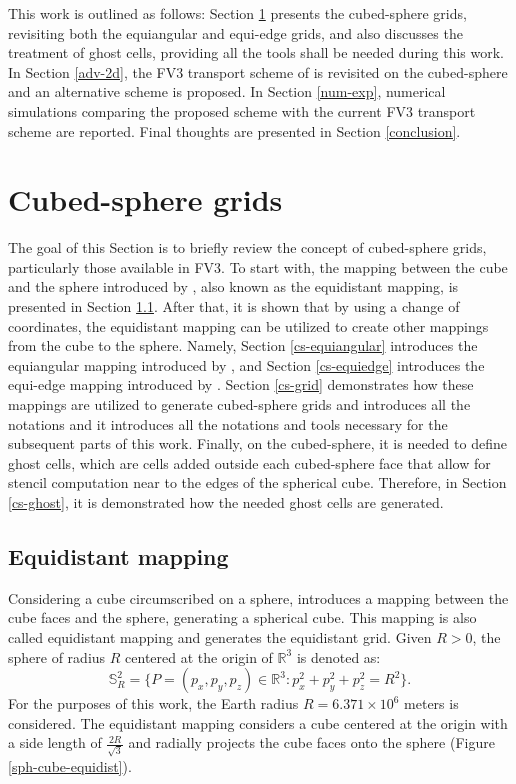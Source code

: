 \documentclass[preprint,12pt]{elsarticle}
\begin{document}
\begin{linenumbers}
This work is outlined as follows:
Section \ref{cs-grids} presents the cubed-sphere grids, revisiting both the equiangular and equi-edge grids, and also discusses the treatment of ghost cells, providing all the tools shall be needed during this work.
In Section \ref{adv-2d}, the FV3 transport scheme of \cite{putman:2007} is revisited on the cubed-sphere and an alternative scheme is proposed.
In Section \ref{num-exp}, numerical simulations comparing the proposed scheme with the current FV3 transport scheme are reported.
Final thoughts are presented in Section \ref{conclusion}.

\newpage
\section{Cubed-sphere grids}
\label{cs-grids}
The goal of this Section is to briefly review the concept of cubed-sphere grids, particularly those available in FV3.
To start with, the mapping between the cube and the sphere introduced by \cite{sadourny:1972}, also known as the equidistant mapping, is presented in Section \ref{cs-equidistant}.
After that, it is shown that by using a change of coordinates, the equidistant mapping can be utilized to create other mappings from the cube to the sphere.
Namely, Section \ref{cs-equiangular} introduces the equiangular mapping introduced by \cite{ronchi:1996}, and Section \ref{cs-equiedge} introduces the equi-edge mapping introduced by \cite{chen:2021}. 
Section \ref{cs-grid} demonstrates how these mappings are utilized to generate cubed-sphere grids and introduces all the notations and it introduces all the notations and tools necessary for the subsequent parts of this work.
Finally, on the cubed-sphere, it is needed to define ghost cells, which are cells added outside each cubed-sphere face that allow for stencil computation near to the edges of the spherical cube.
Therefore, in Section \ref{cs-ghost}, it is demonstrated how the needed ghost cells are generated.

\subsection{Equidistant mapping}
\label{cs-equidistant}
Considering a cube circumscribed on a sphere, \cite{sadourny:1972} introduces a mapping between the cube faces and the sphere, generating a spherical cube.
This mapping is also called equidistant mapping and generates the equidistant grid.
Given $R>0$, the sphere of radius $R$ 
centered at the origin of  $\mathbb{R}^3$ is denoted as:
\begin{equation}
	\label{s2_r}
	\mathbb{S}^2_R = \{ P = (p_x,p_y,p_z) \in \mathbb{R}^3: p_x^2 + p_y^2 + p_z^2 = R^2\}.
\end{equation}
For the purposes of this work, the Earth radius $R=6.371\times 10^6$ meters is considered.
The equidistant mapping considers a cube centered at the origin with a side length of $\frac{2R}{\sqrt{3}}$ and radially projects the cube faces onto the sphere (Figure \ref{sph-cube-equidist}).


\end{linenumbers}
\end{document}
